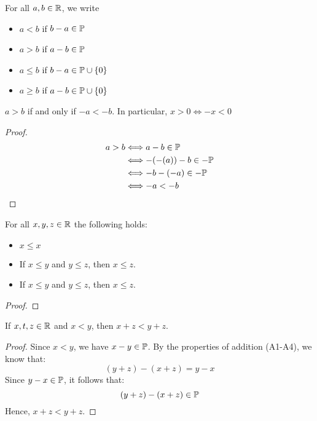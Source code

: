 \documentclass[11pt]{article}
\begin{document}
\begin{fact}
	For all \(a , b \in \mathbb R\), we write
	\begin{itemize}
		\item \(a < b\) if \(b - a \in \mathbb P\)
		\item \(a > b\) if \(a - b \in \mathbb P\)
		\item \(a \leq b\) if \(b - a \in \mathbb P \cup \{0\}\)
		\item \(a \geq b\) if \(a - b \in \mathbb P \cup \{0\}\)
	\end{itemize}
\end{fact}

\begin{proposition}
	\(a > b\) if and only if \(-a < -b\). In particular, \(x > 0 \Longleftrightarrow -x < 0\)
\end{proposition}
\begin{proof}
	\begin{align*}
		a > b & \Longleftrightarrow  a - b \in \mathbb P        \\
		      & \Longleftrightarrow  -(-(a)) - b \in -\mathbb P \\
		      & \Longleftrightarrow  -b -(-a) \in -\mathbb P    \\
		      & \Longleftrightarrow  -a < -b
	\end{align*}
\end{proof}
\begin{proposition}
	For all \(x, y, z \in \mathbb R\) the following holds:
	\begin{itemize}
		\item \(x \leq x\)
		\item If \(x \leq y\) and \(y \leq z\), then \(x \leq z\).
		\item If \(x \leq y\) and \(y \leq z\), then \(x \leq z\).
	\end{itemize}
\end{proposition}
\begin{proof}

\end{proof}

\begin{proposition}
	If \(x, t, z \in \mathbb R\) and \(x < y\), then \(x + z < y + z\).
\end{proposition}
\begin{proof}
	Since \(x < y\), we have \(x - y \in \mathbb P\).
	By the properties of addition (A1-A4), we know that:
	\[
		(y + z) - (x + z) = y - x
	\]
	Since \(y - x \in \mathbb P\), it follows that:
	\[
		(y + z) - (x + z) \in \mathbb P
	\]
	Hence, \(x + z < y + z\).
\end{proof}
\end{document}
